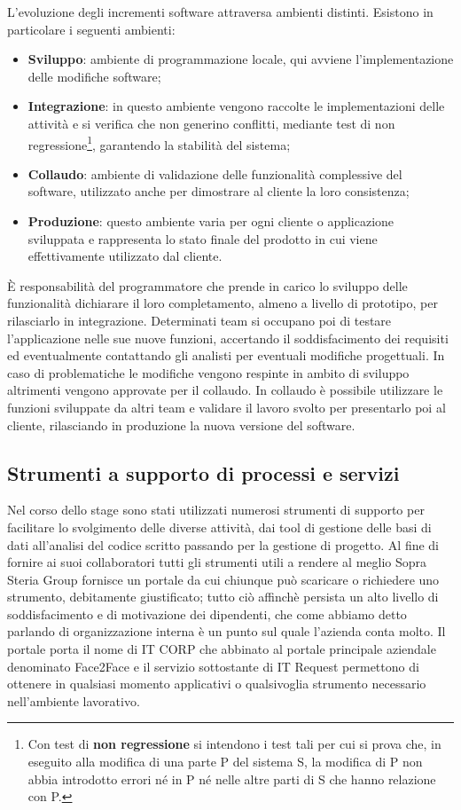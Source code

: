 	L'evoluzione degli incrementi software attraversa ambienti distinti.%
	Esistono in particolare i seguenti ambienti:
	\begin{itemize}
		\item \textbf{Sviluppo}: ambiente di programmazione locale, qui avviene l'implementazione delle modifiche software;
		\item \textbf{Integrazione}: in questo ambiente vengono raccolte le implementazioni delle attività e si verifica che non generino conflitti, mediante test di non regressione\footnote{Con test di \textbf{non regressione} si intendono i test tali per cui si prova che, in eseguito alla modifica di una parte P del sistema S, la modifica di P non abbia introdotto errori né in P né nelle altre parti di S che hanno relazione con P.}, garantendo la stabilità del sistema;
		\item \textbf{Collaudo}: ambiente di validazione delle funzionalità complessive del software, utilizzato anche per dimostrare al cliente la loro consistenza;
		\item \textbf{Produzione}: questo ambiente varia per ogni cliente o applicazione sviluppata e rappresenta lo stato finale del prodotto in cui viene effettivamente utilizzato dal cliente.
	\end{itemize}	
	
	È responsabilità del programmatore che prende in carico lo sviluppo delle funzionalità dichiarare il loro completamento, almeno a livello di prototipo, per rilasciarlo in integrazione. Determinati team si occupano poi di testare l'applicazione nelle sue nuove funzioni, accertando il soddisfacimento dei requisiti ed eventualmente contattando gli analisti per eventuali modifiche progettuali. In caso di problematiche le modifiche vengono respinte in ambito di sviluppo altrimenti vengono approvate per il collaudo. In collaudo è possibile utilizzare le funzioni sviluppate da altri team e validare il lavoro svolto per presentarlo poi al cliente, rilasciando in produzione la nuova versione del software.
	
	\subsection{Strumenti a supporto di processi e servizi}

	Nel corso dello stage sono stati utilizzati numerosi strumenti di supporto per facilitare lo svolgimento delle diverse attività, dai tool di gestione delle basi di dati all'analisi del codice scritto passando per la gestione di progetto. Al fine di fornire ai suoi collaboratori tutti gli strumenti utili a rendere al meglio Sopra Steria Group fornisce un portale da cui chiunque può scaricare o richiedere uno strumento, debitamente giustificato; tutto ciò affinchè persista un alto livello di soddisfacimento e di motivazione dei dipendenti, che come abbiamo detto parlando di organizzazione interna è un punto sul quale l'azienda conta molto. Il portale porta il nome di IT CORP che abbinato al portale principale aziendale denominato Face2Face e il servizio sottostante di IT Request permettono di ottenere in qualsiasi momento applicativi o qualsivoglia strumento necessario nell'ambiente lavorativo.

